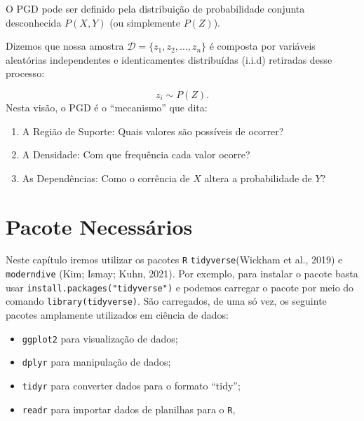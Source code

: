 \documentclass[
  letterpaper,
  DIV=11,
  numbers=noendperiod]{scrreprt}
\begin{document}
\begin{tcolorbox}[enhanced jigsaw, colback=white, leftrule=.75mm, colbacktitle=quarto-callout-tip-color!10!white, breakable, titlerule=0mm, bottomtitle=1mm, title=\textcolor{quarto-callout-tip-color}{\faLightbulb}\hspace{0.5em}{Representação Matemática}, colframe=quarto-callout-tip-color-frame, toprule=.15mm, opacityback=0, bottomrule=.15mm, opacitybacktitle=0.6, arc=.35mm, toptitle=1mm, rightrule=.15mm, coltitle=black, left=2mm]

O PGD pode ser definido pela distribuição de probabilidade conjunta
desconhecida \(P(X, Y)\) (ou simplemente \(P(Z)\)).

Dizemos que nossa amostra \(\mathcal{D} = \{z_1, z_2, \dots, z_n \}\) é
composta por variáveis aleatórias independentes e identicamentes
distribuídas (i.i.d) retiradas desse processo:

\[z_i \sim P(Z).\] Nesta visão, o PGD é o ``mecanismo'' que dita:

\begin{enumerate}
\def\labelenumi{\arabic{enumi}.}
\item
  A Região de Suporte: Quais valores são possíveis de ocorrer?
\item
  A Densidade: Com que frequência cada valor ocorre?
\item
  As Dependências: Como o corrência de \(X\) altera a probabilidade de
  \(Y\)?
\end{enumerate}

\end{tcolorbox}

\section{Pacote Necessários}\label{pacote-necessuxe1rios}

Neste capítulo iremos utilizar os pacotes \texttt{R}
\texttt{tidyverse}(Wickham et al., 2019) e \texttt{moderndive} (Kim;
Ismay; Kuhn, 2021). Por exemplo, para instalar o pacote basta usar
\texttt{install.packages("tidyverse")} e podemos carregar o pacote por
meio do comando \texttt{library(tidyverse)}. São carregados, de uma só
vez, os seguinte pacotes amplamente utilizados em ciência de dados:

\begin{itemize}
\item
  \texttt{ggplot2} para visualização de dados;
\item
  \texttt{dplyr} para manipulação de dados;
\item
  \texttt{tidyr} para converter dados para o formato ``tidy'';
\item
  \texttt{readr} para importar dados de planilhas para o \texttt{R},
\end{itemize}
\end{document}
